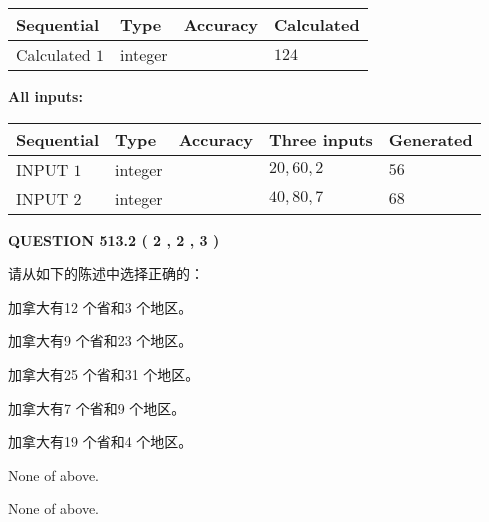 \documentclass{ctexart}
\begin{document}
  
\noindent\begin{tabular}{|l|l|l|l|}
\hline
 Sequential & Type & Accuracy & Calculated \\ 
\hline
 
 
  Calculated $  1 $ & integer &  & 
  $ 124 $ 
 \\  \hline  
 \end{tabular}
   
   
   
   
\noindent\vspace{0.1in}\hspace{-0.08in} {\textbf{\Large{All inputs: }}}
   
   
  
  
\noindent\begin{tabular}{|l|l|l|l|l|}
\hline
 Sequential & Type & Accuracy & Three inputs & Generated \\ 
\hline
 
 
  INPUT $  1 $ & integer &  & $
 20
 , 
 60
 , 
 2
 $ & $ 56 $ 
 \\  \hline  
 
 
  INPUT $  2 $ & integer &  & $
 40
 , 
 80
 , 
 7
 $ & $ 68 $ 
 \\  \hline  
 \end{tabular}
   
   
  
\vspace{0.2in}
  
{\textbf{\Large{QUESTION
513.2 
 ( 2 , 2 , 3 )
}}}
  
  
请从如下的陈述中选择正确的：
 
 
加拿大有12 个省和3 个地区。
 
 
加拿大有9 个省和23 个地区。
 
 
加拿大有25 个省和31 个地区。
 
 
加拿大有7 个省和9 个地区。
 
 
加拿大有19 个省和4 个地区。
 
 
 None of above.
 
 
\noindent{}
 
 
 None of above.
 
 
\noindent{}
 
\end{document}
